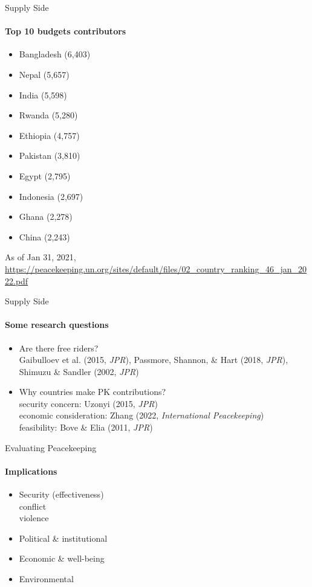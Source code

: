 \documentclass[handout]{beamer}
\begin{document}
\begin{frame}{Supply Side}
\framesubtitle{Top 10 budgets contributors}
\begin{itemize}
    \pause\item {} Bangladesh (6,403)
    \pause\item {} Nepal (5,657)
    \pause\item {} India (5,598)
    \pause\item {} Rwanda (5,280)
    \pause\item {} Ethiopia (4,757)
    \pause\item {} Pakistan (3,810)
    \pause\item {} Egypt (2,795)
    \pause\item {} Indonesia (2,697)
    \pause\item {} Ghana (2,278)
    \pause\item {} China (2,243)
\end{itemize}
\tiny As of Jan 31, 2021, \url{https://peacekeeping.un.org/sites/default/files/02_country_ranking_46_jan_2022.pdf}
\end{frame}

\begin{frame}{Supply Side}
\framesubtitle{Some research questions}
\begin{itemize}
    \pause\item Are there free riders?\\
    \pause      Gaibulloev et al. (2015, \textit{JPR}), Passmore, Shannon, \& Hart (2018, \textit{JPR}), Shimuzu \& Sandler (2002, \textit{JPR})
    \pause\item Why countries make PK contributions?\\
    \pause      security concern: Uzonyi (2015, \textit{JPR})\\
    \pause      economic consideration: Zhang (2022, \textit{International Peacekeeping})\\
    \pause      feasibility: Bove \& Elia (2011, \textit{JPR})
\end{itemize}
\end{frame}

\begin{frame}{Evaluating Peacekeeping}
\framesubtitle{Implications}
\begin{itemize}
    \pause\item Security (effectiveness)\\
    \pause      conflict\\
    \pause      violence
    \pause\item Political \& institutional
    \pause\item Economic \& well-being
    \pause\item Environmental
\end{itemize}  
\end{frame}
\end{document}

